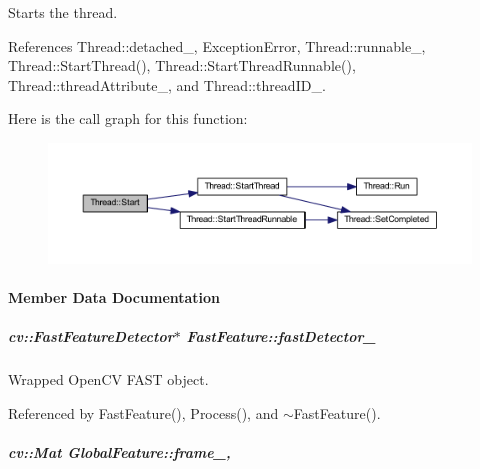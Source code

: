 Starts the thread. 



References Thread\-::detached\-\_\-, Exception\-Error, Thread\-::runnable\-\_\-, Thread\-::\-Start\-Thread(), Thread\-::\-Start\-Thread\-Runnable(), Thread\-::thread\-Attribute\-\_\-, and Thread\-::thread\-I\-D\-\_\-.



Here is the call graph for this function\-:
\nopagebreak
\begin{figure}[H]
\begin{center}
\leavevmode
\includegraphics[width=350pt]{group___core_a2b42f82341afd2747ea093b6ac8b91cb_cgraph}
\end{center}
\end{figure}




\paragraph{Member Data Documentation}
\hypertarget{group___feature_extractor_a4978fabcb2c02a6828672ecf09b1fbec}{
\subparagraph[{fast\-Detector\-\_\-}]{\setlength{\rightskip}{0pt plus 5cm}cv\-::\-Fast\-Feature\-Detector$\ast$ Fast\-Feature\-::fast\-Detector\-\_\-\hspace{0.3cm}{\ttfamily [private]}}}\label{group___feature_extractor_a4978fabcb2c02a6828672ecf09b1fbec}


Wrapped Open\-C\-V F\-A\-S\-T object. 



Referenced by Fast\-Feature(), Process(), and $\sim$\-Fast\-Feature().

\hypertarget{group___feature_extractor_aae4295da2c3999edcb99b46d70ee7166}{
\subparagraph[{frame\-\_\-}]{\setlength{\rightskip}{0pt plus 5cm}cv\-::\-Mat Global\-Feature\-::frame\-\_\-\hspace{0.3cm}{\ttfamily [protected]}, {\ttfamily [inherited]}}}\label{group___feature_extractor_aae4295da2c3999edcb99b46d70ee7166}


